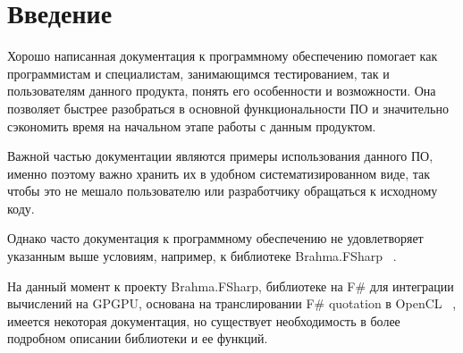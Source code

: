 \documentclass[14pt]{matmex-diploma}
\begin{document}
\maketitle
\tableofcontents
\section*{Введение}
Хорошо написанная документация к программному обеспечению помогает как программистам и специалистам, занимающимся тестированием, так и пользователям данного продукта, понять его особенности и возможности. Она позволяет быстрее разобраться в основной функциональности ПО и значительно сэкономить время на начальном этапе работы с данным продуктом. 
 
Важной частью документации являются примеры использования данного ПО, именно поэтому важно хранить их в удобном систематизированном виде, так чтобы это не мешало пользователю или разработчику обращаться к исходному коду.
 
Однако часто документация к программному обеспечению не удовлетворяет указанным выше условиям, например, к библиотеке \linebreak Brahma.FSharp ~\cite{brahma}.
 
На данный момент к проекту Brahma.FSharp, библиотеке на F\# для интеграции вычислений на GPGPU, основана на транслировании F\# quotation в OpenCL ~\cite{opencl}, имеется некоторая документация, но существует необходимость в более подробном описании библиотеки и ее функций.
 
\end{document}
